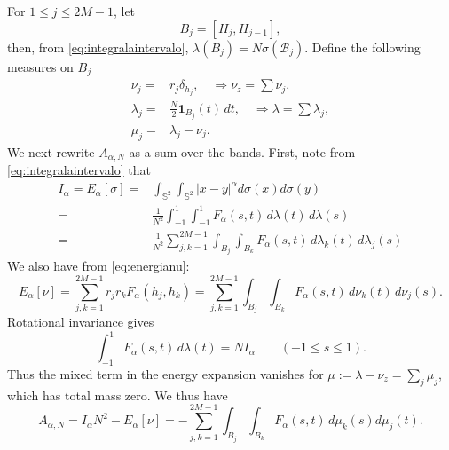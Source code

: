 \documentclass[11pt]{amsart}
\newcommand{\Sph}{\mathbb S^2}
\begin{document}
For $1\le j\le 2M-1$, let
\[
 B_j=[H_j,H_{j-1}],
\]
then, from \eqref{eq:integralaintervalo}, $\lambda(B_j)=N\sigma(\mathcal B_j)$.
Define the following measures on $B_j$
\begin{align*}
 \nu_j={}&r_j\delta_{h_j},\quad\Rightarrow \nu_z=\sum\nu_j,\\
 \lambda_j={}&\frac N2\mathbf 1_{B_j}(t)\,dt,\quad\Rightarrow \lambda=\sum\lambda_j,\\
 \mu_j={}&\lambda_j-\nu_j.
\end{align*}
We next rewrite $A_{\alpha,N}$ as a sum over the bands. First, note from \eqref{eq:integralaintervalo} that
\begin{align*}
    I_\alpha=E_\alpha[\sigma]=&\int_{\Sph}\int_{\Sph}|x-y|^\alpha d \sigma(x)d \sigma(y)\\
    =&\frac1{N^2}\int_{-1}^1\int_{-1}^1F_\alpha(s,t)\,d\lambda(t)\,d\lambda(s)\\
=&\frac1{N^2}\sum_{j,k=1}^{2M-1}\int_{B_j}\int_{B_k}F_\alpha(s,t)\,d\lambda_k(t)\,d\lambda_j(s)
\end{align*}
We also have from \eqref{eq:energianu}:
\begin{equation*}
 E_\alpha[\nu]=\sum_{j,k=1}^{2M-1}r_jr_k F_\alpha(h_j,h_k)
=\sum_{j,k=1}^{2M-1}\int_{B_j}\int_{B_k} F_\alpha(s,t)\,d\nu_k(t)\,d\nu_j(s).
\end{equation*}
Rotational invariance gives
\[
 \int_{-1}^1F_\alpha(s,t)\,d\lambda(t)=NI_\alpha
 \qquad(-1\le s\le1).
\]
Thus the mixed term in the energy expansion vanishes for
$\mu:=\lambda-\nu_z=\sum_j\mu_j$, which has total mass zero.
We thus have
\begin{equation}\label{eq:latitude-decomposition}
 A_{\alpha,N}
 =I_\alpha N^2-E_\alpha[\nu]
 =-\sum_{j,k=1}^{2M-1}
   \int_{B_j}\int_{B_k}F_\alpha(s,t)\,d\mu_k(s)d\mu_j(t).
\end{equation}
\end{document}

